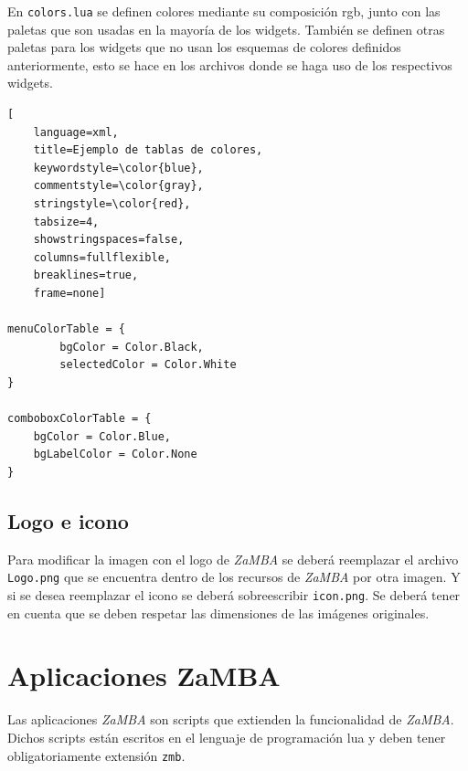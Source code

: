 En \texttt{colors.lua} se definen colores mediante su composición rgb, junto con las paletas que son usadas en la mayoría de los widgets. 
También se definen otras paletas para los widgets que no usan los esquemas de colores definidos anteriormente, esto se hace en los archivos donde se haga uso de los respectivos widgets.
\pagebreak
\begin{lstlisting}[
	language=xml,
	title=Ejemplo de tablas de colores,
	keywordstyle=\color{blue},
	commentstyle=\color{gray},
	stringstyle=\color{red},
	tabsize=4,
	showstringspaces=false,
	columns=fullflexible,
	breaklines=true,
	frame=none]
	
menuColorTable = {
		bgColor = Color.Black,
		selectedColor = Color.White
}

comboboxColorTable = {
	bgColor = Color.Blue,
	bgLabelColor = Color.None
}
\end{lstlisting}

\subsection{Logo e icono}
Para modificar la imagen con el logo de \emph{ZaMBA} se deberá reemplazar el archivo \texttt{Logo.png} que se encuentra dentro de los recursos de \emph{ZaMBA} por otra imagen. Y si se desea reemplazar el icono se deberá sobreescribir \texttt{icon.png}. 
Se deberá tener en cuenta que se deben respetar las dimensiones de las imágenes originales.

\section{Aplicaciones ZaMBA}

Las aplicaciones \emph{ZaMBA} son scripts que extienden la funcionalidad de \emph{ZaMBA}. Dichos scripts están escritos en el lenguaje de programación lua y deben tener obligatoriamente extensión \texttt{zmb}.

